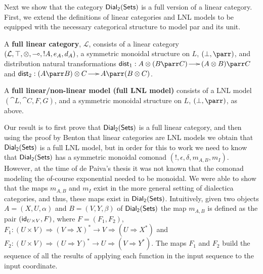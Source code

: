 Next we show that the category $\mathsf{Dial_2}(\mathsf{Sets})$ is a full version of a linear
category. First, we extend the definitions of linear categories and
LNL models to be equipped with the necessary categorical structure to
model par and its unit.
\begin{definition}
  \label{def:full-linear-cat}
  A \textbf{full linear category}, $\mathcal{L}$, consists of a linear
  category \\$(\mathcal{L}, \top, \otimes, \multimap,!A,e_A,d_A)$, a symmetric
  monoidal structure on $L$, $(\perp, \parr)$, and distribution
  natural transformations $\mathsf{dist}_1 : A \otimes (B \parr C) \to
  (A \otimes B) \parr C$ and $\mathsf{dist}_2 : (A \parr B) \otimes C
  \to A \parr (B \otimes C)$.
\end{definition}
\begin{definition}
  \label{def:full-lnl-model}
  A \textbf{full linear/non-linear model (full LNL model)} consists of
  a LNL model $(\cat{L}, \cat{C},F,G)$, and a symmetric monoidal
  structure on $L$, $(\perp, \parr)$, as above.
\end{definition}

\noindent
Our result is to first prove that $\mathsf{Dial_2}(\mathsf{Sets})$ is a full linear category,
and then using the proof by Benton that linear categories are LNL
models we obtain that $\mathsf{Dial_2}(\mathsf{Sets})$ is a full LNL model, but in order for
this to work we need to know that $\mathsf{Dial_2}(\mathsf{Sets})$ has a symmetric monoidal
comonad $(!, \epsilon, \delta, m_{A,B}, m_I)$.  However, at the time
of de Paiva's thesis it was not known that the comonad modeling the
of-course exponential needed to be monoidal.  We were able to show
that the maps $m_{A,B}$ and $m_I$ exist in the more general setting of
dialectica categories, and thus, these maps exist in
$\mathsf{Dial_2}(\mathsf{Sets})$. Intuitively, given two objects $A = (X,U,\alpha)$ and $B =
(V,Y,\beta)$ of $\mathsf{Dial_2}(\mathsf{Sets})$ the map $m_{A,B}$ is defined as the pair
$(\mathsf{id}_{U \times V},F)$, where $F = (F_1,F_2)$, $F_1 : (U \times V)
\Rightarrow (V \Rightarrow X)^* \to V \Rightarrow (U \Rightarrow X^*)$
and $F_2 : (U \times V) \Rightarrow (U \Rightarrow Y)^* \to U
\Rightarrow (V \Rightarrow Y^*)$.  The maps $F_1$ and $F_2$ build the
sequence of all the results of applying each function in the input
sequence to the input coordinate.

